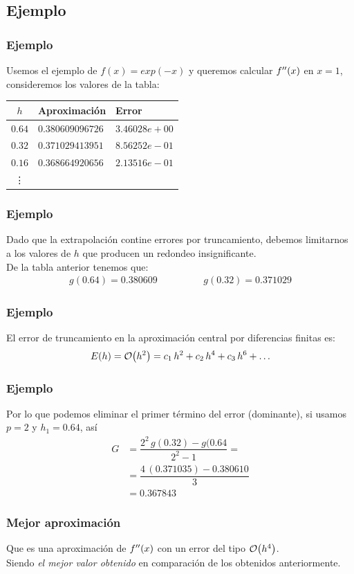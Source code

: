 \subsection*{Ejemplo}
\begin{frame}
\frametitle{Ejemplo}
Usemos el ejemplo de $f(x) = exp(-x)$ y queremos calcular ${f}^{\prime \prime}(x)$ en $x=1$, consideremos los valores de la tabla:
\begin{table}
\centering
\begin{tabular}{c | l | l}
$h$ & Aproximación & Error \\ \hline
$0.64$ & $0.380609096726$ & $3.46028e+00$ \\ \hline
$0.32$ & $0.371029413951$ & $8.56252e-01$ \\ \hline
$0.16$ & $0.368664920656$ & $2.13516e-01$ \\ \hline
\vdots & & \\ \hline
\end{tabular}
\end{table}
\end{frame}
\begin{frame}
\frametitle{Ejemplo}
Dado que la extrapolación contine errores por truncamiento, debemos limitarnos a los valores de $h$ que producen un redondeo insignificante.
\\
\bigskip
\pause
De la tabla anterior tenemos que:
\begin{align*}
g(0.64) = 0.380609 \hspace{2cm} g(0.32) = 0.371029
\end{align*}
\end{frame}
\begin{frame}
\frametitle{Ejemplo}
El error de truncamiento en la aproximación central por diferencias finitas es:
\begin{align*}
E(h) = \order{h^{2}} = c_{1} \, h^{2} + c_{2} \, h^{4} + c_{3} \, h^{6} + \ldots
\end{align*}
\end{frame}
\begin{frame}
\frametitle{Ejemplo}
Por lo que podemos eliminar el primer término del error (dominante), si usamos $p = 2$ y $h_{1} = 0.64$, así
\begin{align*}
G &= \dfrac{2^{2} \, g(0.32) - g(0.64}{2^{2}-1} = \\[0.5em]
&= \dfrac{4 \, (0.371035) - 0.380610}{3} \\[0.5em]
&= 0.367843
\end{align*}
\end{frame}
\begin{frame}
\frametitle{Mejor aproximación}
Que es una aproximación de ${f}^{\prime \prime}(x)$ con un error del tipo $\order{h^{4}}$.
\\
\bigskip
\pause
Siendo \emph{el mejor valor obtenido} en comparación de los obtenidos anteriormente.
\end{frame}
